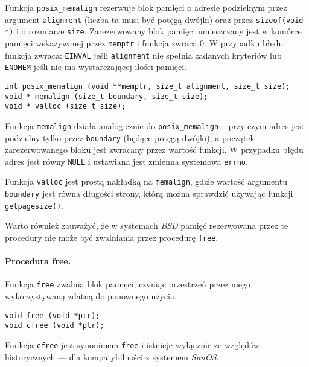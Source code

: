 \documentclass[12pt,a4paper,titlepage,twoside]{mwart}
\begin{document}
Funkcja \texttt{posix\_memalign} rezerwuje blok pamięci o adresie podzielnym
przez argument \texttt{alignment} (liczba ta musi być potęgą dwójki) oraz przez
\texttt{sizeof(void *)} i o rozmiarze \texttt{size}. Zarezerwowany blok pamięci
umieszczany jest w komórce pamięci wskazywanej przez \texttt{memptr} i funkcja
zwraca $0$. W przypadku błędu funkcja zwraca: \texttt{EINVAL} jeśli
\texttt{alignment} nie spełnia zadanych kryteriów lub \texttt{ENOMEM} jeśli nie
ma wystarczającej ilości pamięci.

\vspace{2ex}
\begin{lstlisting}[caption={Prototyp procedury \texttt{posix\_memalign}, \texttt{memalign} i \texttt{valloc}.},xleftmargin=0cm,xrightmargin=0cm]
int posix_memalign (void **memptr, size_t alignment, size_t size);
void * memalign (size_t boundary, size_t size);
void * valloc (size_t size);
\end{lstlisting}

Funkcja \texttt{memalign} działa analogicznie do \texttt{posix\_memalign} --
przy czym adres jest podzielny tylko przez \texttt{boundary} (będące potęgą
dwójki), a początek zarezerwowanego bloku jest zwracany przez wartość funkcji.
W przypadku błędu adres jest równy \texttt{NULL} i ustawiana jest zmienna
systemowa \texttt{errno}.

Funkcja \texttt{valloc} jest prostą nakładką na \texttt{memalign}, gdzie
wartość argumentu \texttt{boundary} jest równa długości strony, którą można
sprawdzić używając funkcji \texttt{getpagesize()}.

Warto również zauważyć, że w systemach \textit{BSD} pamięć rezerwowana przez te
procedury nie może być zwalniania przez procedurę \texttt{free}.

\paragraph{Procedura free.}

Funkcja \texttt{free} zwalnia blok pamięci, czyniąc przestrzeń przez niego
wykorzystywaną zdatną do ponownego użycia.

\vspace{2ex}
\begin{lstlisting}[caption={Prototyp procedury \texttt{free} i \texttt{cfree}.}]
void free (void *ptr);
void cfree (void *ptr);
\end{lstlisting}

Funkcja \texttt{cfree} jest synonimem \texttt{free} i istnieje wyłącznie ze
względów historycznych --- dla kompatybilności z systemem \textit{SunOS}.
\end{document}
